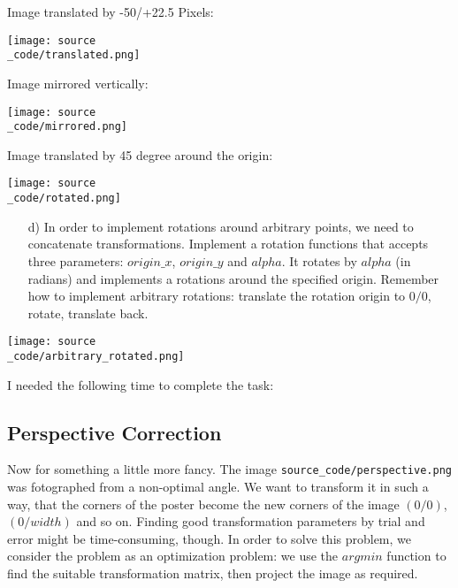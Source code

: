 Image translated by -50/+22.5 Pixels:

\begin{center}
\texttt{[image: source\\\_code/translated.png]} \\
\end{center}

Image mirrored vertically:

\begin{center}
\texttt{[image: source\\\_code/mirrored.png]} \\
\end{center}

Image translated by 45 degree around the origin:

\begin{center}
\texttt{[image: source\\\_code/rotated.png]} \\
\end{center}

\begin{enumerate}
\item[d)] In order to implement rotations around arbitrary points, we need to concatenate transformations. Implement a rotation functions that accepts three parameters:
$origin\_x$, $origin\_y$ and $alpha$. It rotates by  $alpha$ (in radians) and implements a rotations around the specified origin. Remember how to implement arbitrary rotations: translate the rotation origin to $0/0$, rotate, translate back.
\end{enumerate}

\begin{center}
\texttt{[image: source\\\_code/arbitrary\_rotated.png]}
\end{center}

I needed the following time to complete the task:

\subsection{Perspective Correction}

Now for something a little more fancy. The image \texttt{source\_code/perspective.png} was fotographed from a non-optimal angle. We want to transform it in such a way, that the corners
of the poster become the new corners of the image $(0/0)$, $(0/width)$ and so on. Finding good transformation parameters by trial and error might be time-consuming, though.
In order to solve this problem, we consider the problem as an optimization problem: we use the $argmin$ function to find the suitable transformation matrix, then project the image as required.

